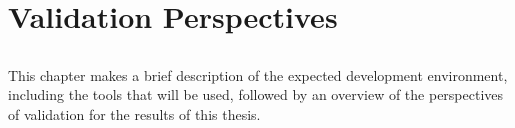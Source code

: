 \chapter{Validation Perspectives} \label{chap:validation}

\section*{}

This chapter makes a brief description of the expected development environment, including the tools that will be used, followed by an overview of the perspectives of validation for the results of this thesis.


